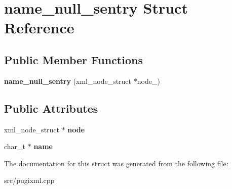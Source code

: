 \hypertarget{structname__null__sentry}{}\section{name\+\_\+null\+\_\+sentry Struct Reference}
\label{structname__null__sentry}
\subsection*{Public Member Functions}
\begin{DoxyCompactItemize}
\item 
\mbox{\label{structname__null__sentry_ae5d1789457736acd9d669bc4765bd811}} 
{\bfseries name\+\_\+null\+\_\+sentry} (xml\+\_\+node\+\_\+struct $\ast$node\+\_\+)
\end{DoxyCompactItemize}
\subsection*{Public Attributes}
\begin{DoxyCompactItemize}
\item 
\mbox{\label{structname__null__sentry_ab85be926948869639d135bc03324a6f0}} 
xml\+\_\+node\+\_\+struct $\ast$ {\bfseries node}
\item 
\mbox{\label{structname__null__sentry_a8847bb799593cb873c863ab6f88299d6}} 
char\+\_\+t $\ast$ {\bfseries name}
\end{DoxyCompactItemize}


The documentation for this struct was generated from the following file\+:\begin{DoxyCompactItemize}
\item 
src/pugixml.\+cpp\end{DoxyCompactItemize}
